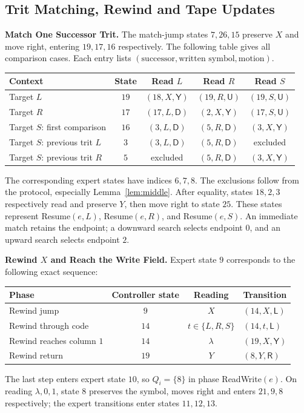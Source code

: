 \documentclass[11pt,a4paper]{article}
\newcommand{\blank}{\lambda}
\newcommand{\triple}[3]{(#1,#2,\mathsf{#3})}
\begin{document}
\newpage
\subsection{Trit Matching, Rewind and Tape Updates}\label{sec:part5}
\textbf{Match One Successor Trit.}
The match-jump states $7,26,15$ preserve $X$ and move right, entering
$19,17,16$ respectively. The following table gives all comparison cases.
Each entry lists $(\text{successor},\text{written symbol},\text{motion})$.

\begin{center}
\small\renewcommand{\arraystretch}{1.25}
\begin{tabular}{l c ccc}
\toprule\rowcolor{Pale}Context & State & Read $L$ & Read $R$ & Read $S$\\\midrule
Target $L$ & $19$ & $\triple{18}{X}{Y}$ & $\triple{19}{R}{U}$ & $\triple{19}{S}{U}$\\
Target $R$ & $17$ & $\triple{17}{L}{D}$ & $\triple{2}{X}{Y}$ & $\triple{17}{S}{U}$\\
Target $S$: first comparison & $16$ & $\triple{3}{L}{D}$ & $\triple{5}{R}{D}$ & $\triple{3}{X}{Y}$\\
Target $S$: previous trit $L$ & $3$ & $\triple{3}{L}{D}$ & $\triple{5}{R}{D}$ & excluded\\
Target $S$: previous trit $R$ & $5$ & excluded & $\triple{5}{R}{D}$ & $\triple{3}{X}{Y}$\\
\bottomrule
\end{tabular}
\end{center}
The corresponding expert states have indices $6,7,8$. The exclusions follow from the
protocol, especially Lemma~\ref{lem:middle}. After equality, states $18,2,3$
respectively read and preserve $Y$, then move right to state $25$.
These states represent Resume$(e,L)$, Resume$(e,R)$, and Resume$(e,S)$.
An immediate match retains the endpoint; a downward search selects endpoint
$0$, and an upward search selects endpoint $2$.

\textbf{Rewind $X$ and Reach the Write Field.}
Expert state $9$ corresponds to the following exact sequence:
\begin{center}
\small\renewcommand{\arraystretch}{1.22}
\begin{tabular}{l c c l}
\toprule\rowcolor{Pale}Phase & Controller state & Reading & Transition\\\midrule
Rewind jump & $9$ & $X$ & $\triple{14}{X}{L}$\\
Rewind through code & $14$ & $t\in\{L,R,S\}$ & $\triple{14}{t}{L}$\\
Rewind reaches column $1$ & $14$ & $\blank$ & $\triple{19}{X}{Y}$\\
Rewind return & $19$ & $Y$ & $\triple{8}{Y}{R}$\\
\bottomrule
\end{tabular}
\end{center}
The last step enters expert state $10$, so $Q_i=\{8\}$ in phase ReadWrite$(e)$.
On reading $\blank,0,1$, state $8$ preserves the symbol, moves right and
enters $21,9,8$ respectively; the expert transitions enter states $11,12,13$.
\end{document}
